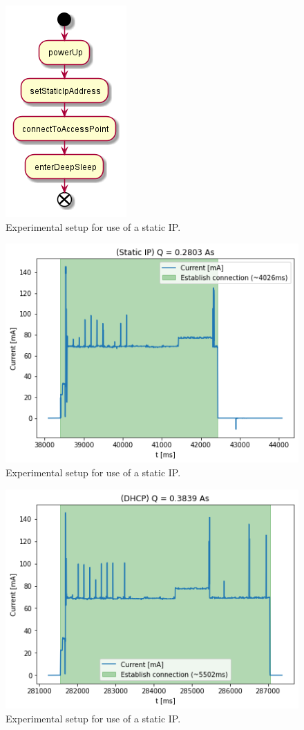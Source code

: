 \begin{figure}[h]
    \centering
    \includegraphics[width = 0.35 \linewidth]{fig/sequence_static_ip.png}
    \caption{Experimental setup for use of a static IP.}
    \label{fig:experiment_static_ip}
\end{figure}
\begin{figure}[h]
    \centering
    \includegraphics[width =\linewidth]{fig/static_ip.png}
    \caption{Experimental setup for use of a static IP.}
    \label{fig:static_ip}
\end{figure}
\begin{figure}[h]
    \centering
    \includegraphics[width =\linewidth]{fig/dhcp.png}
    \caption{Experimental setup for use of a static IP.}
    \label{fig:dhcp}
\end{figure}